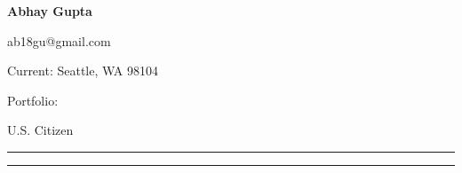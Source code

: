 
\hspace{1ex}
{\fontsize{35}{60}\textbf{Abhay Gupta}}

\vspace{-11ex}

\begin{subtitle}
    ab18gu@gmail.com
        \,\SubBulletSymbol\,
            \href{\LinkedIn}{\LinkedIn}
                \,\SubBulletSymbol\,\href{\github}{\github}
    \par{Current: \color{cblue} Seattle, WA 98104}
    \par{Portfolio: \color{blue} \textbf{\href{\CVWebg}{\CVWeb}{}}}
    \par{U.S. Citizen}
\end{subtitle}

\vspace{-3ex}
{\hspace{0.07in}\noindent\color{dblue}\rule{7.1in}{0.4pt}}

\vspace{-3ex}
{\hspace{0.07in}\noindent\color{dblue}\rule{7.1in}{0.4pt}}

